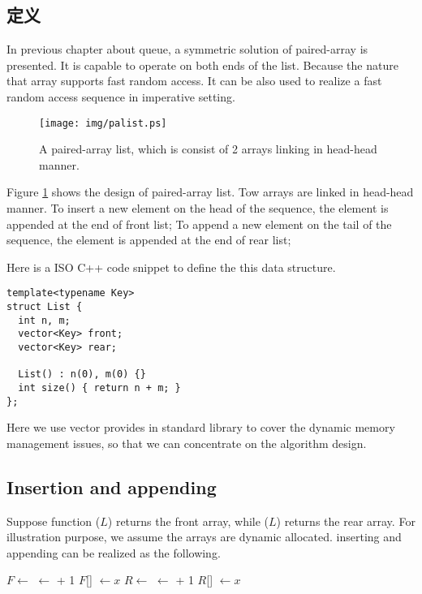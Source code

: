 \documentclass[UTF8]{article}
\begin{document}
\subsection{定义}
In previous chapter about queue, a symmetric solution of paired-array is presented.
It is capable to operate on both ends of the list. Because the nature that array supports
fast random access. It can be also used to realize a fast random access sequence
in imperative setting.

\begin{figure}[htbp]
  \centering
  \texttt{[image: img/palist.ps]}
  \caption{A paired-array list, which is consist of 2 arrays linking in head-head manner.} \label{fig:palist}
\end{figure}

Figure \ref{fig:palist} shows the design of paired-array list. Tow arrays are linked in head-head manner.
To insert a new element on the head of the sequence, the element is appended at the end of front list;
To append a new element on the tail of the sequence, the element is appended at the end of rear list;

Here is a ISO C++ code snippet to define the this data structure.

\lstset{language=C++}
\begin{lstlisting}
template<typename Key>
struct List {
  int n, m;
  vector<Key> front;
  vector<Key> rear;

  List() : n(0), m(0) {}
  int size() { return n + m; }
};
\end{lstlisting}

Here we use vector provides in standard library to cover the dynamic memory management issues, so
that we can concentrate on the algorithm design.

\subsection{Insertion and appending}
Suppose function ($L$) returns the front array, while ($L$) returns the
rear array. For illustration purpose, we assume the arrays are dynamic allocated. inserting and appending
can be realized as the following.

\begin{algorithmic}
  \State $F \gets $ 
  \State {} $\gets $  + 1
  \State $F$[] $\gets x$
\EndFunction
\Statex
{}
  \State $R \gets $ 
  \State {} $\gets $  + 1
  \State $R$[] $\gets x$
\EndFunction
\end{algorithmic}
\end{document}
